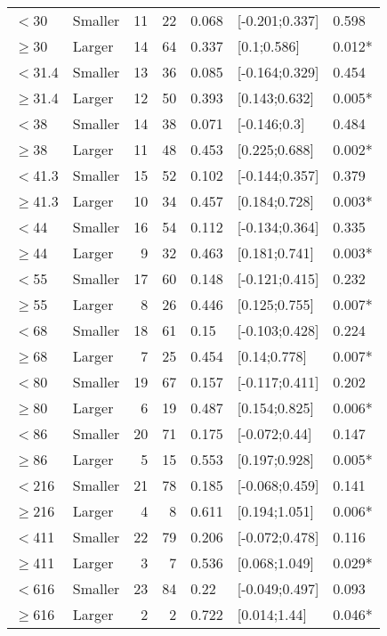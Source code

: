 \documentclass{article}
\begin{document}
\begin{table}[H]
\begin{tabular}{llrrlll}
  $<$30 & Smaller & 11 & 22 & 0.068 & [-0.201;0.337] & 0.598 \\ 
  $\ge$30 & Larger & 14 & 64 & 0.337 & [0.1;0.586] & 0.012* \\ 
  $<$31.4 & Smaller & 13 & 36 & 0.085 & [-0.164;0.329] & 0.454 \\ 
  $\ge$31.4 & Larger & 12 & 50 & 0.393 & [0.143;0.632] & 0.005* \\ 
  $<$38 & Smaller & 14 & 38 & 0.071 & [-0.146;0.3] & 0.484 \\ 
  $\ge$38 & Larger & 11 & 48 & 0.453 & [0.225;0.688] & 0.002* \\ 
  $<$41.3 & Smaller & 15 & 52 & 0.102 & [-0.144;0.357] & 0.379 \\ 
  $\ge$41.3 & Larger & 10 & 34 & 0.457 & [0.184;0.728] & 0.003* \\ 
  $<$44 & Smaller & 16 & 54 & 0.112 & [-0.134;0.364] & 0.335 \\ 
  $\ge$44 & Larger & 9 & 32 & 0.463 & [0.181;0.741] & 0.003* \\ 
  $<$55 & Smaller & 17 & 60 & 0.148 & [-0.121;0.415] & 0.232 \\ 
  $\ge$55 & Larger & 8 & 26 & 0.446 & [0.125;0.755] & 0.007* \\ 
  $<$68 & Smaller & 18 & 61 & 0.15 & [-0.103;0.428] & 0.224 \\ 
  $\ge$68 & Larger & 7 & 25 & 0.454 & [0.14;0.778] & 0.007* \\ 
  $<$80 & Smaller & 19 & 67 & 0.157 & [-0.117;0.411] & 0.202 \\ 
  $\ge$80 & Larger & 6 & 19 & 0.487 & [0.154;0.825] & 0.006* \\ 
  $<$86 & Smaller & 20 & 71 & 0.175 & [-0.072;0.44] & 0.147 \\ 
  $\ge$86 & Larger & 5 & 15 & 0.553 & [0.197;0.928] & 0.005* \\ 
  $<$216 & Smaller & 21 & 78 & 0.185 & [-0.068;0.459] & 0.141 \\ 
  $\ge$216 & Larger & 4 & 8 & 0.611 & [0.194;1.051] & 0.006* \\ 
  $<$411 & Smaller & 22 & 79 & 0.206 & [-0.072;0.478] & 0.116 \\ 
  $\ge$411 & Larger & 3 & 7 & 0.536 & [0.068;1.049] & 0.029* \\ 
  $<$616 & Smaller & 23 & 84 & 0.22 & [-0.049;0.497] & 0.093 \\ 
  $\ge$616 & Larger & 2 & 2 & 0.722 & [0.014;1.44] & 0.046* \\ 
  \hline
  \end{tabular}
  \end{table}
\end{document}
